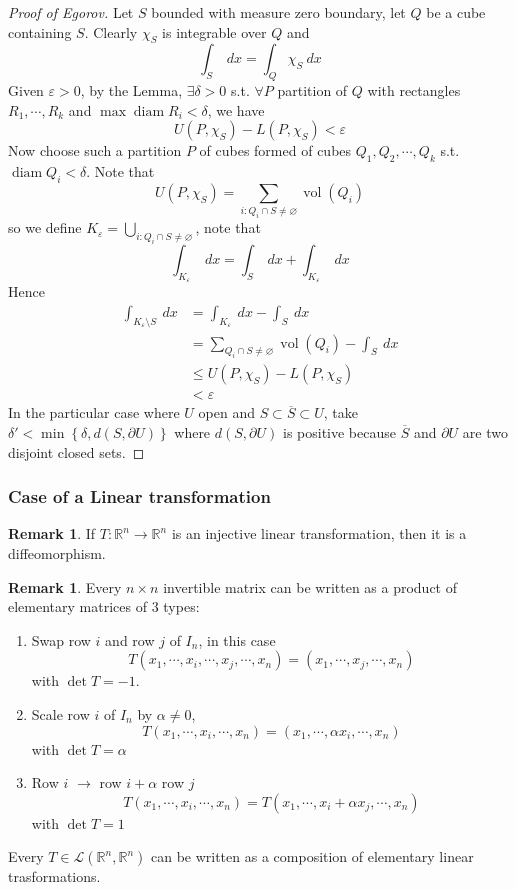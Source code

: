 \documentclass[11pt,a4paper]{article}
\theoremstyle{definition}
\newtheorem{remark}[definition]{Remark}
\theoremstyle{plain}
\theoremstyle{remark}
\newcommand{\R}{\mathbb{R}}
\renewcommand{\set}[1]{\left\{ #1 \right\}}
\newcommand{\vol}{\operatorname{vol}}
\begin{document}
\begin{proof}[Proof of Egorov]
    Let $S$ bounded with measure zero boundary, let $Q$ be a cube containing $S$. Clearly $\chi_S$ is integrable over $Q$ and 
    $$\int_S \ dx = \int_Q \chi_S \ dx$$
    Given $\varepsilon > 0$, by the Lemma, $\exists \delta > 0$ s.t. $\forall P$ partition of $Q$ with rectangles $R_1, \cdots, R_k$ and $\max \operatorname{diam} R_i < \delta$, 
    we have 
    $$U(P, \chi_S) - L(P, \chi_S) < \varepsilon$$
    Now choose such a partition $P$ of cubes formed of cubes $Q_1, Q_2, \cdots, Q_k$ s.t. $\operatorname{diam} Q_i < \delta$. 
    Note that 
    $$U(P, \chi_S) = \sum_{i \colon Q_i \cap S \ne \varnothing} \vol (Q_i)$$
    so we define $K_\varepsilon = \bigcup_{i \colon Q_i \cap S \ne \varnothing}$, note that 
    $$\int_{K_\varepsilon} \ dx = \int_S \ dx + \int_{K_\varepsilon} \ dx$$
    Hence 
    \begin{align*}
        \int_{K_\varepsilon \setminus S } \ dx &= \int_{K_\varepsilon} \ dx - \int_S \ dx \\
        &= \sum_{Q_i \cap S \ne \varnothing} \vol (Q_i) - \int_S \ dx \\
        &\le U(P, \chi_S) - L(P, \chi_S) \\
        &< \varepsilon
    \end{align*} 
    In the particular case where $U$ open and $S \subset \overline{S} \subset U$, take $\delta' < \min \set{\delta, d(S, \partial U)}$ where $d(S, \partial U)$ is positive 
    because $\overline{S}$ and $\partial U$ are two disjoint closed sets.
\end{proof}

\subsubsection{Case of a Linear transformation}
\begin{remark}
    If $T \colon \R^n \to \R^n$ is an injective linear transformation, then it is a diffeomorphism. 
\end{remark}

\begin{remark}
    Every $n \times n$ invertible matrix can be written as a product of elementary matrices of $3$ types: 
    \begin{enumerate}
        \item Swap row $i$ and row $j$ of $I_n$, in this case 
        $$T(x_1,\cdots, x_i, \cdots, x_j, \cdots, x_n) = (x_1, \cdots, x_j, \cdots, x_n)$$
        with $\det T = -1$.
        \item Scale row $i$ of $I_n$ by $\alpha \ne 0$, 
        $$T(x_1, \cdots, x_i, \cdots, x_n) = (x_1, \cdots, \alpha x_i, \cdots, x_n)$$
        with $\det T = \alpha$
        \item Row $i$ $\to$ row $i + \alpha$ row $j$ 
        $$T(x_1, \cdots, x_i, \cdots, x_n) = T(x_1, \cdots, x_i + \alpha x_j, \cdots, x_n)$$
        with $\det T = 1$
    \end{enumerate}
    Every $T \in \mathcal{L} (\R^n, \R^n)$ can be written as a composition of elementary linear trasformations. 
\end{remark}
\end{document}
